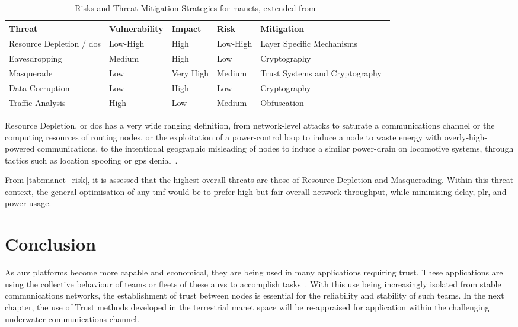 \begin{table}
	\caption{Risks and Threat Mitigation Strategies for \glspl{manet}, extended from~\cite{Kidston2010}}
	\label{tab:manet_risk}
	\begin{tabularx}{\textwidth}{p{3cm} X X X >{\raggedright\arraybackslash}p{4cm}}\toprule
		Threat & Vulnerability & Impact & Risk & Mitigation	\\\midrule
		Resource Depletion / \gls{dos} & Low-High & High & Low-High & Layer Specific Mechanisms~\cite{Wu2007,Nwaocha2015}\\
		Eavesdropping & Medium & High & Low & Cryptography~\cite{Chen2010}\\
		Masquerade & Low & Very High & Medium & Trust Systems and Cryptography~\cite{Wang2009a}\\
		Data Corruption & Low & High & Low & Cryptography\\
		Traffic Analysis & High & Low & Medium & Obfuscation~\cite{Huang2010}\\
	\end{tabularx}
\end{table}

Resource Depletion, or \gls{dos} has a very wide ranging definition, from network-level attacks to saturate a communications channel or the computing resources of routing nodes, or the exploitation of a power-control loop to induce a node to waste energy with overly-high-powered communications, to the intentional geographic misleading of nodes to induce a similar power-drain on locomotive systems, through tactics such as location spoofing or \gls{gps} denial~\cite{Zuba2015}.

From \autoref{tab:manet_risk}, it is assessed that the highest overall threats are those of Resource Depletion and Masquerading.
Within this threat context, the general optimisation of any \gls{tmf} would be to prefer high but fair overall network throughput, while minimising delay, \gls{plr}, and power usage.
\pagebreak
\section{Conclusion}

As \acrfull{auv} platforms become more capable and economical, they are being used in many applications requiring trust.
These applications are using the collective behaviour of teams or fleets of these \glspl{auv} to accomplish tasks~\cite{Caiti2011}.
With this use being increasingly isolated from stable communications networks, the establishment of trust between nodes is essential for the reliability and stability of such teams.
In the next chapter, the use of Trust methods developed in the terrestrial \gls{manet} space will be re-appraised for application within the challenging underwater communications channel.


